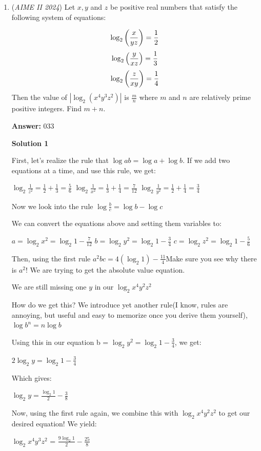 \begin{enumerate}
 


	\item (\textit{AIME II 2024}) Let $x,y$ and $z$ be positive real numbers that satisfy the following system of equations:

 \[\log_2\left({x \over yz}\right) = {1 \over 2}\]
 \[\log_2\left({y \over xz}\right) = {1 \over 3}\]
 \[\log_2\left({z \over xy}\right) = {1 \over 4}\]
Then the value of $\left|\log_2(x^4y^3z^2)\right|$ is $\frac{m}{n}$ where $m$ and $n$ are relatively prime positive integers. Find $m+n$.


 
 \textbf{Answer: }033



\textbf{Solution 1}

First, let’s realize the rule that $\log{a}{b}=\log{a}+\log{b}$. If we add two equations at a time, and use this rule, we get:

 $\log_2{\frac{1}{z^2}} = \frac{1}{2}+\frac{1}{3}= \frac{5}{6}$
$\log_2{\frac{1}{x^2}} = \frac{1}{3}+\frac{1}{4}= \frac{7}{12}$
$\log_2{\frac{1}{y^2}} = \frac{1}{2}+\frac{1}{4}= \frac{3}{4}$

 Now we look into the rule $\log{\frac{b}{c}}=\log{b}-\log{c}$

 We can convert the equations above and setting them variables to:

 $a = \log_2{x^2}=\log_2{1}-\frac{7}{12}$
$b = \log_2{y^2}=\log_2{1}-\frac{3}{4}$
$c = \log_2{z^2}=\log_2{1}-\frac{5}{6}$

 Then, using the first rule $a^2bc = 4(\log_2{1})-\frac{11}{4}$Make sure you see why there is $a^2$! We are trying to get the absolute value equation. 

 We are still missing one $y$ in our $\log_2{x^4y^2z^2}$

 How do we get this? We introduce yet another rule(I know, rules are annoying, but useful and easy to memorize once you derive them yourself), $\log{b^n}=n\log{b}$

 Using this in our equation b = $\log_2{y^2}=\log_2{1}-\frac{3}{4}$, we get: 

 $2\log_2{y} = \log_2{1}-\frac{3}{4}$

 Which gives:

 $\log_2{y}=\frac{\log_2{1}}{2}-\frac{3}{8}$

 Now, using the first rule again, we combine this with $\log_2{x^4y^2z^2}$ to get our desired equation! We yield:

 $\log_2{x^4y^3z^2}$ = $\frac{9\log_2{1}}{2}-\frac{25}{8}$


\end{enumerate}
